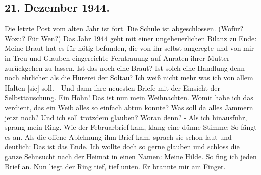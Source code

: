 \subsection{21. Dezember 1944.}

Die letzte Post vom alten Jahr ist fort.
Die Schule ist abgeschlossen.
(Wof\"{u}r? Wozu? F\"{u}r Wen?)
Das Jahr 1944 geht mit einer ungeheuerlichen Bilanz zu Ende: Meine Braut hat es f\"{u}r n\"{o}tig befunden, die von ihr selbst angeregte und von mir in Treu und Glauben eingereichte Ferntrauung auf Anraten ihrer Mutter zur\"{u}ckgehen zu lassen.
Ist das noch eine Braut?
Ist solch eine Handlung denn noch ehrlicher als die Hurerei der Soltau?
Ich wei{\ss} nicht mehr was ich von allem Halten{\color{red} [sic] } soll. -
Und dann ihre neuesten Briefe mit der Einsicht der Selbstt\"{a}uschung.
Ein Hohn!
Das ist nun mein Weihnachten.
Womit habe ich das verdient, das ein Weib alles so einfach abtun konnte?
Was soll da alles Jammern jetzt noch?
Und ich soll trotzdem glauben?
Woran denn? -
Als ich hinausfuhr, sprang mein Ring.
Wie der Februarbrief kam, klang eine d\"{u}nne Stimme: So f\"{a}ngt es an.
Als die offene Ablehnung ihm Brief kam, sprach sie schon laut und deutlich: Das ist das Ende.
Ich wollte doch so gerne glauben und schloss die ganze Sehnsucht nach der Heimat in einen Namen: Meine Hilde.
So fing ich jeden Brief an.
Nun liegt der Ring tief, tief unten.
Er brannte mir am Finger.

\clearpage
